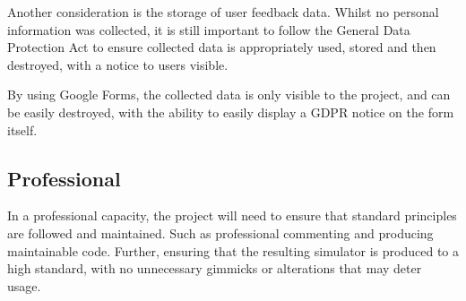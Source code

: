 Another consideration is the storage of user feedback data. Whilst no personal information was collected, it is still important to follow the General Data Protection Act \cite{theeuropeanparliamentandthecounciloftheeuropeanunion_2016_regulation} to ensure collected data is appropriately used, stored and then destroyed, with a notice to users visible. 

By using Google Forms, the collected data is only visible to the project, and can be easily destroyed, with the ability to easily display a GDPR notice on the form itself.

\subsection{Professional}
In a professional capacity, the project will need to ensure that standard principles are followed and maintained. Such as professional commenting and producing maintainable code. Further, ensuring that the resulting simulator is produced to a high standard, with no unnecessary gimmicks or alterations that may deter usage.
